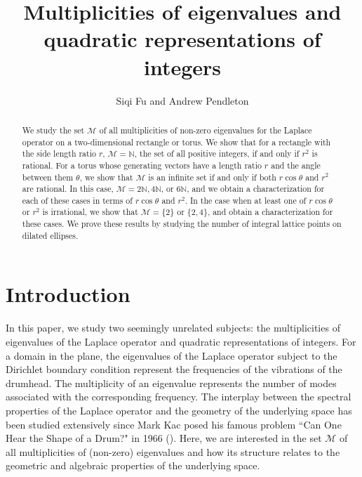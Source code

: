 \documentclass[11pt]{amsart}
\title[Multiplicities and Quadratic Representations]{Multiplicities of eigenvalues and quadratic representations of integers}
\author{Siqi Fu and Andrew Pendleton}
\theoremstyle{definition}
\def\sm{{\mathcal M}}
\def\N{{\mathbb N}}
\begin{document}
\maketitle
\begin{abstract}
    We study the set $\sm$ of all multiplicities of non-zero eigenvalues for the Laplace operator on a two-dimensional rectangle or torus. We show that for a rectangle with the side length ratio $r$, $\sm=\N$, the set of all positive integers, if and only if $r^2$ is rational. 
    For a torus whose generating vectors have a length ratio $r$ and the angle between them $\theta$, we show that $\sm$ is an infinite set if and only if both $r\cos\theta$ and $r^2$ are rational. In this case, $\sm=2\mathbb{N}, 4\mathbb{N}$, or $6\mathbb{N}$, and we obtain a characterization for each of these cases in terms of $r\cos\theta$ and $r^2$. In the case when at least one of $r\cos\theta$ or $r^2$ is irrational, we show that $\sm=\{2\}$ or $\{2, 4\}$, and obtain a characterization for these cases. We prove these results by studying the number of integral lattice points on dilated ellipses.  


\bigskip
{}

\smallskip

\end{abstract}

\section{Introduction} \label{intro}

In this paper, we study two seemingly unrelated subjects: the multiplicities of eigenvalues of the Laplace operator and quadratic representations of integers. For a domain in the plane, the eigenvalues of the Laplace operator subject to the Dirichlet boundary condition represent the frequencies of the vibrations of the drumhead. The multiplicity of an eigenvalue represents the number of modes associated with the corresponding frequency. The interplay between the spectral properties of the Laplace operator and the geometry of the underlying space has been studied extensively since Mark Kac posed his famous problem ``Can One Hear the Shape of a Drum?" in 1966 (\cite{Kac1966}). Here, we are interested in the set $\sm$ of all multiplicities of (non-zero) eigenvalues and how its structure relates to the geometric and algebraic properties of the underlying space. 
\end{document}
